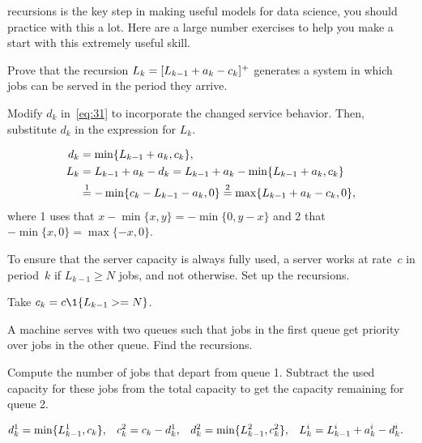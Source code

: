 \documentclass[queueing-book.tex]{subfiles}
\begin{document}
 recursions is the key step in making useful models for data science, you should practice with this a lot.
Here are a large number exercises to help you make a start with this extremely useful skill.

\begin{exercise}\label{ex:24}
Prove  that the recursion
$L_k = [L_{k-1}+a_k - c_k]^+$
generates a system in which jobs can be served in the period they arrive.
\begin{hint}
  Modify $d_k$ in~\cref{eq:31} to incorporate the changed service behavior.
  Then, substitute $d_k$ in the expression for $L_k$.
\end{hint}
\begin{solution}
 \begin{align*}
 d_k &= \min\{L_{k-1}+a_k, c_k\}, \\
L_k &= L_{k-1} + a_k - d_k  = L_{k-1} + a_k - \min\{L_{k-1}+a_k, c_k\} \\
&\stackrel1= -\min\{c_{k} - L_{k-1} - a_k, 0\} \stackrel2=  \max\{L_{k-1} + a_k - c_k, 0 \},
 \end{align*}
 where 1 uses that $x - \min\{x, y\} = -\min\{0, y-x\}$ and 2 that $-\min\{x, 0\} = \max\{-x, 0\}$.
\end{solution}
\end{exercise}




\begin{exercise}\label{ex:50}
To ensure that the server capacity is always fully used, 
a server  works at rate~$c$ in period~$k$  if $L_{k-1}\geq N$ jobs, and not otherwise.
Set up the recursions.
\begin{solution}
Take $c_k = c\1{\L_{k-1} >= N}$.
\end{solution}
\end{exercise}






\begin{exercise}\label{ex:l-117}
 A machine  
serves  with two queues such that jobs in the first queue get priority over jobs in the other queue.
 Find the recursions.
\begin{hint}
  Compute the number of jobs that depart from queue 1.
  Subtract the used capacity for these jobs from the total capacity to get the capacity remaining for queue 2.
\end{hint}
\begin{solution}
\begin{align*}
 d_{k}^1 &= \min\{L^1_{k-1}, c_k\}, & c^2_{k} &= c_k - d^1_{k}, & d^2_{k} &= \min\{L^2_{k-1}, c^2_{k}\}, &
 L^i_{k} &= L^i_{k-1} + a^i_{k} - d^i_{k}.
\end{align*}
\end{solution}
\end{exercise}
\end{document}
